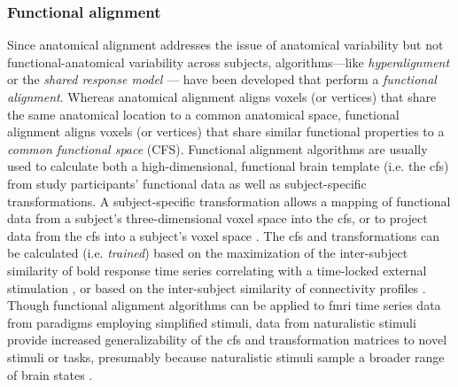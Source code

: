 \subsubsection{Functional alignment}


%
Since anatomical alignment addresses the issue of anatomical variability but not
functional-anatomical variability across subjects, algorithms---like
\textit{hyperalignment} \citep{haxby2011common, guntupalli2016model} or the
\textit{shared response model} \citep{chen2015reduced, zhang2016searchlight}---
have been developed that perform a \textit{functional alignment}.
%
Whereas anatomical alignment aligns voxels (or vertices) that share the same
anatomical location to a common anatomical space, functional alignment aligns
voxels (or vertices) that share similar functional properties to a
\textit{common functional space} (CFS).
%
Functional alignment algorithms are usually used to calculate both a
high-dimensional, functional brain template (i.e. the \ac{cfs}) from study
participants' functional data as well as subject-specific transformations.
%
A subject-specific transformation allows a mapping of functional data from a
subject's three-dimensional voxel space into the \ac{cfs}, or to project data
from the \ac{cfs} into a subject's voxel space \citep{haxby2020hyperalignment,
kumar2020brainiak}.
%
The \ac{cfs} and transformations can be calculated (i.e. \textit{trained})
based on the maximization of the inter-subject similarity of \ac{bold} response
time series correlating with a time-locked external stimulation
\citep{haxby2011common, chen2015reduced, sabuncu2010function}, or based on the
inter-subject similarity of connectivity profiles \citep{feilong2018reliable,
guntupalli2018computational, nastase2019leveraging}.
%
Though functional alignment algorithms can be applied to \ac{fmri} time series
data from paradigms employing simplified stimuli, data from naturalistic stimuli
provide
%
increased generalizability of the \ac{cfs}
%
and transformation matrices
%
to novel stimuli or tasks, presumably because naturalistic stimuli sample a
broader range of brain states \citep{haxby2011common, guntupalli2016model}.





